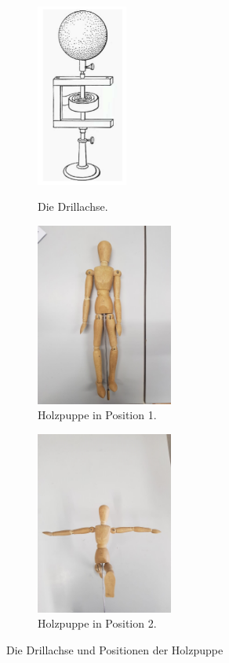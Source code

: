 \begin{figure}[H]
\centering
\begin{subfigure}{0.48\textwidth}
  \centering
  \includegraphics[height=6cm]{Drillachse.PNG}
  \caption{Die Drillachse.} \cite{kent}
  \label{fig:drill}
\end{subfigure}
\begin{subfigure}{0.48\textwidth}
\centering
\includegraphics[height=6cm]{position1.jpg}
\caption{Holzpuppe in Position 1.}
\label{fig:p1}
\end{subfigure}
\begin{subfigure}{0.48\textwidth}
\centering
\includegraphics[height=6cm]{position2.jpg}
\caption{Holzpuppe in Position 2.}
\label{fig:TU}
\end{subfigure}
\caption{Die Drillachse und Positionen der Holzpuppe}
\label{fig:versuche}
\end{figure}
%
%
